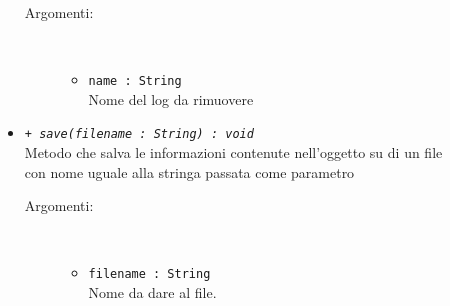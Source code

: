 \documentclass[../DefinizioneDiProdotto.tex]{subfiles}
\begin{document}
\begin{description}
\begin{itemize}
\begin{description}
			\item[Argomenti:] \
			\begin{itemize}
				\item \texttt{name : String}\\
				Nome del log da rimuovere\end{itemize}
		\end{description}
		\item \texttt{+ \textit{save(filename : String) : void}}\\
		Metodo che salva le informazioni contenute nell'oggetto su di un file con nome uguale alla stringa passata come parametro
		\begin{description}
			\item[Argomenti:] \
			\begin{itemize}
				\item \texttt{filename : String}\\
				Nome da dare al file.\end{itemize}
		\end{description}
	\end{itemize}
\end{description}
\end{document}
